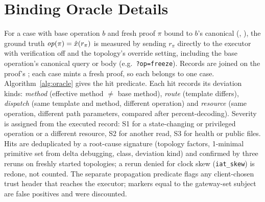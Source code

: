 \section{Binding Oracle Details}\label{app:oracle}
For a case with base operation $b$ and fresh proof $\pi$ bound to $b$'s
canonical (\htm, \htu), the ground truth $\mathit{op}(\pi)=\hat{x}(r_\pi)$ is measured
by sending $r_\pi$ directly to the executor with verification off and the
topology's override setting, including the base operation's canonical query or
body (e.g.\ \texttt{?op=freeze}). Records are joined on the proof's \jti; each
case mints a fresh proof, so each \jti belongs to one case.
Algorithm~\ref{alg:oracle} gives the hit predicate. Each hit records its
deviation kinds: \emph{method} (effective method $\neq$ base method),
\emph{route} (template differs), \emph{dispatch} (same template and method,
different operation) and \emph{resource} (same operation, different path
parameters, compared after percent-decoding). Severity is assigned from the
executed record: \textsf{S1} for a state-changing or privileged operation or a
different resource, \textsf{S2} for another read, \textsf{S3} for health or
public files. Hits are deduplicated by a root-cause signature (topology
factors, 1-minimal primitive set from delta debugging, class, deviation kind)
and confirmed by three reruns on freshly started topologies; a rerun denied for
clock skew (\texttt{iat\_skew}) is redone, not counted. The separate \GC
propagation predicate flags any client-chosen trust header that reaches the
executor; markers equal to the gateway-set subject are false positives and were
discounted.
